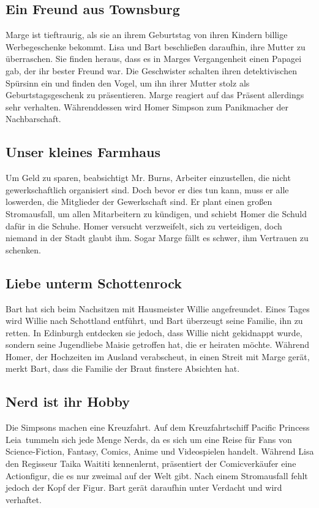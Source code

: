 \subsection{Ein Freund aus Townsburg}
Marge ist tieftraurig, als sie an ihrem Geburtstag von ihren Kindern billige Werbegeschenke bekommt. Lisa und Bart beschließen daraufhin, ihre Mutter zu überraschen. Sie finden heraus, dass es in Marges Vergangenheit einen Papagei gab, der ihr bester Freund war. Die Geschwister schalten ihren detektivischen Spürsinn ein und finden den Vogel, um ihn ihrer Mutter stolz als Geburtstagsgeschenk zu präsentieren. Marge reagiert auf das Präsent allerdings sehr verhalten. Währenddessen wird Homer Simpson zum Panikmacher der Nachbarschaft.


\subsection{Unser kleines Farmhaus}
Um Geld zu sparen, beabsichtigt Mr. Burns, Arbeiter einzustellen, die nicht gewerkschaftlich organisiert sind. Doch bevor er dies tun kann, muss er alle loswerden, die Mitglieder der Gewerkschaft sind. Er plant einen großen Stromausfall, um allen Mitarbeitern zu kündigen, und schiebt Homer die Schuld dafür in die Schuhe. Homer versucht verzweifelt, sich zu verteidigen, doch niemand in der Stadt glaubt ihm. Sogar Marge fällt es schwer, ihm Vertrauen zu schenken.

\subsection{Liebe unterm Schottenrock}
Bart hat sich beim Nachsitzen mit Hausmeister Willie angefreundet. Eines Tages wird Willie nach Schottland entführt, und Bart überzeugt seine Familie, ihn zu retten. In Edinburgh entdecken sie jedoch, dass Willie nicht gekidnappt wurde, sondern seine Jugendliebe Maisie getroffen hat, die er heiraten möchte. Während Homer, der Hochzeiten im Ausland verabscheut, in einen Streit mit Marge gerät, merkt Bart, dass die Familie der Braut finstere Absichten hat.

\subsection{Nerd ist ihr Hobby}
Die Simpsons machen eine Kreuzfahrt. Auf dem Kreuzfahrtschiff \glqq Pacific Princess Leia\grqq\ tummeln sich jede Menge Nerds, da es sich um eine Reise für Fans von Science-Fiction, Fantasy, Comics, Anime und Videospielen handelt. Während Lisa den Regisseur Taika Waititi kennenlernt, präsentiert der Comicverkäufer eine Actionfigur, die es nur zweimal auf der Welt gibt. Nach einem Stromausfall fehlt jedoch der Kopf der Figur. Bart gerät daraufhin unter Verdacht und wird verhaftet.

